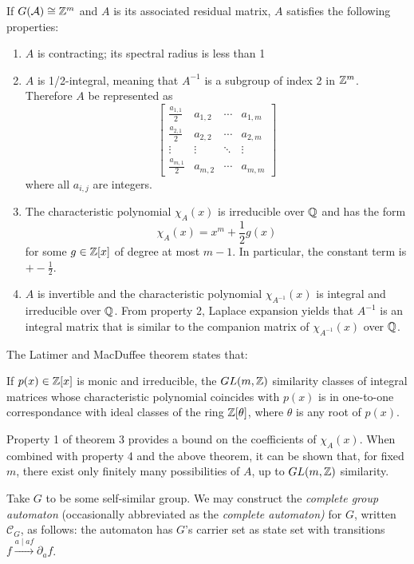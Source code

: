 \documentclass[11pt, titlepage]{article}
\begin{document}
\begin{theorem}
If $G(\mathcal{A}) \cong \mathbb{Z}^m$ and $A$ is its associated
residual matrix, $A$ satisfies the following properties:
\begin{enumerate}
\item $A$ is contracting; its spectral radius is less than 1
\item $A$ is 1/2-integral, meaning that $A^{-1}$ is a subgroup of
  index 2 in $\mathbb{Z}^m$. Therefore $A$ be represented as
  \[
    \begin{bmatrix}
      \frac{a_{1,1}}{2} & a_{1,2} & \cdots & a_{1,m} \\
      \frac{a_{2,1}}{2} & a_{2,2} & \cdots & a_{2,m} \\
      \vdots & \vdots & \ddots & \vdots \\
      \frac{a_{m,1}}{2} & a_{m,2} & \cdots & a_{m,m}
    \end{bmatrix}
  \]
  where all
  $a_{i,j}$ are integers.
\item The characteristic polynomial $\chi_A(x)$ is irreducible over
  $\mathbb{Q}$ and has the form
  \[ \chi_A(x) = x^m + \frac{1}{2}g(x) \] for some $g \in \mathbb{Z}[x]$ of
  degree at most $m-1$. In particular, the constant term is
  $+-\frac{1}{2}$.
\item $A$ is invertible and the characteristic polynomial
  $\chi_{A^{-1}}(x)$ is integral and irreducible over $\mathbb{Q}$. From
  property 2, Laplace expansion yields that $A^{-1}$ is an integral
  matrix that is similar to the companion matrix of $\chi_{A^{-1}}(x)$
  over $\mathbb{Q}$.
\end{enumerate}
\end{theorem}

The Latimer and MacDuffee theorem states that:

\begin{theorem}
  If $p(x) \in \mathbb{Z}[x]$ is monic and irreducible, the $GL(m, \mathbb{Z})$
  similarity classes of integral matrices whose characteristic
  polynomial coincides with $p(x)$ is in one-to-one correspondance
  with ideal classes of the ring $\mathbb{Z}[\theta]$, where $\theta$ is any
  root of $p(x)$.
\end{theorem}

Property 1 of theorem 3 provides a bound on the coefficients of
$\chi_A(x)$. When combined with property 4 and the above theorem, it
can be shown that, for fixed $m$, there exist only finitely many
possibilities of $A$, up to $GL(m, \mathbb{Z})$ similarity.

\begin{definition}
  Take $G$ to be some self-similar group. We may construct the
  \emph{complete group automaton} (occasionally abbreviated as the
  \emph{complete automaton)} for $G$, written $\mathcal{C}_G$, as
  follows: the automaton has $G$'s carrier set as state set with
  transitions $f \stackrel{a\mid af}{\longrightarrow} \partial_a f$.
\end{definition}
\end{document}

